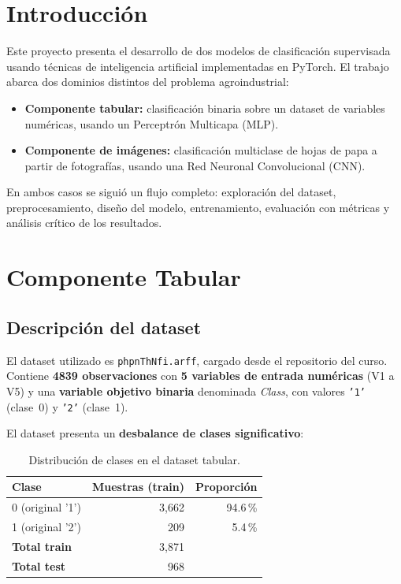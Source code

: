 \documentclass[12pt,a4paper]{article}
\begin{document}
\tableofcontents
\newpage

\section{Introducción}

Este proyecto presenta el desarrollo de dos modelos de clasificación supervisada
usando técnicas de inteligencia artificial implementadas en PyTorch. El trabajo
abarca dos dominios distintos del problema agroindustrial:

\begin{itemize}
  \item \textbf{Componente tabular:} clasificación binaria sobre un dataset
        de variables numéricas, usando un Perceptrón Multicapa (MLP).
  \item \textbf{Componente de imágenes:} clasificación multiclase de hojas
        de papa a partir de fotografías, usando una Red Neuronal Convolucional (CNN).
\end{itemize}

En ambos casos se siguió un flujo completo: exploración del dataset,
preprocesamiento, diseño del modelo, entrenamiento, evaluación con métricas
y análisis crítico de los resultados.

\section{Componente Tabular}

\subsection{Descripción del dataset}

El dataset utilizado es \texttt{phpnThNfi.arff}, cargado desde el repositorio
del curso. Contiene \textbf{4839 observaciones} con \textbf{5 variables de entrada
numéricas} (V1 a V5) y una \textbf{variable objetivo binaria} denominada
\textit{Class}, con valores \texttt{'1'} (clase~0) y \texttt{'2'} (clase~1).

El dataset presenta un \textbf{desbalance de clases significativo}:

\begin{table}[H]
  \centering
  \begin{tabular}{lrr}
    \toprule
    \textbf{Clase} & \textbf{Muestras (train)} & \textbf{Proporción} \\
    \midrule
    0 (original '1') & 3{,}662 & 94.6\,\% \\
    1 (original '2') &   209   &  5.4\,\% \\
    \midrule
    \textbf{Total train} & 3{,}871 & \\
    \textbf{Total test}  &   968   & \\
    \bottomrule
  \end{tabular}
  \caption{Distribución de clases en el dataset tabular.}
\end{table}
\end{document}
